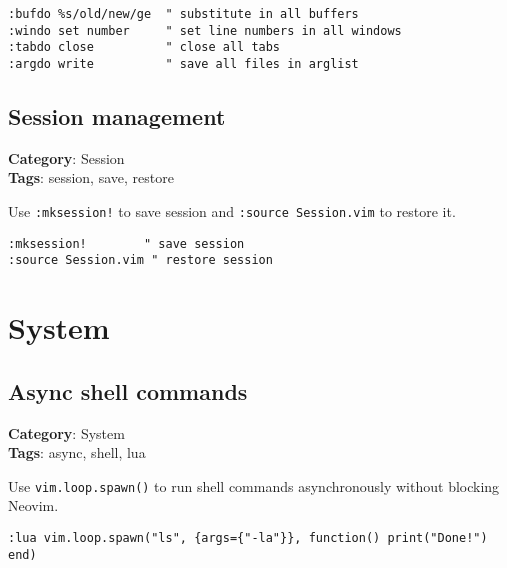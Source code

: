 {{{{{{{{{{{{{\begin{Exa*}{}
\begin{Verbatim}[fontsize=\footnotesize, breaklines, breakanywhere]
:bufdo %s/old/new/ge  " substitute in all buffers
:windo set number     " set line numbers in all windows
:tabdo close          " close all tabs
:argdo write          " save all files in arglist
\end{Verbatim}
\end{Exa*}

\section{Session management}

\textbf{Category}: Session\\ \textbf{Tags}: session, save, restore
\vspace{0.5cm}

Use {\footnotesize \Verb§:mksession!§} to save session and {\footnotesize \Verb§:source Session.vim§} to restore it.

\begin{Exa*}{}
\begin{Verbatim}[fontsize=\footnotesize, breaklines, breakanywhere]
:mksession!        " save session
:source Session.vim " restore session
\end{Verbatim}
\end{Exa*}

\chapter{System}
\section{Async shell commands}

\textbf{Category}: System\\ \textbf{Tags}: async, shell, lua
\vspace{0.5cm}

Use {\footnotesize \Verb§vim.loop.spawn()§} to run shell commands asynchronously without blocking Neovim.

\begin{Exa*}{}
\begin{Verbatim}[fontsize=\footnotesize, breaklines, breakanywhere]
:lua vim.loop.spawn("ls", {args={"-la"}}, function() print("Done!") end)
\end{Verbatim}
\end{Exa*}

}}}}}}}}}}}}}
